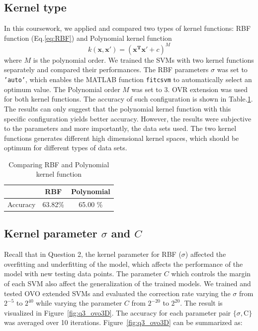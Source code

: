 \documentclass[10pt,twocolumn,letterpaper]{article}
\begin{document}
\subsection{Kernel type}
In this coursework, we applied and compared two types of kernel functions: RBF function (Eq.\ref{eq:RBF}) and Polynomial kernel function
\begin{equation}
k(\boldsymbol{x}, \boldsymbol{x'}) = (\boldsymbol{x^T} \boldsymbol{x'} + c)^M
\label{eq:poly}
\end{equation}
where $M$ is the polynomial order. We trained the SVMs with two kernel functions separately and compared their performances. The RBF parameters $\sigma$ was set to \texttt{'auto'}, which enables the MATLAB function \texttt{fitcsvm} to automatically select an optimum value. The Polynomial order $M$ was set to 3. OVR extension was used for both kernel functions. The accuracy of such configuration is shown in Table.\ref{tab:rbf_poly}. The results can only suggest that the polynomial kernel function with this specific configuration yields better accuracy. However, the results were subjective to the parameters and more importantly, the data sets used. The two kernel functions generates different high dimensional kernel spaces, which should be optimum for different types of data sets.

\begin{table}[h!]
	\centering
	\caption{Comparing RBF and Polynomial kernel function}
	\label{tab:rbf_poly}
	\begin{tabular}{ccc}
		\toprule
		~ & RBF & Polynomial\\
		\midrule
		Accuracy & 63.82\% & 65.00 \%\\
		\bottomrule
	\end{tabular}
\end{table}

\subsection{Kernel parameter $\sigma$ and $C$}
Recall that in Question 2, the kernel parameter for RBF ($\sigma$) affected the overfitting and underfitting of the model, which affects the performance of the model with new testing data points. The parameter $C$ which controls the margin of each SVM also affect the generalization of the trained models. We trained and tested OVO extended SVMs and evaluated the correction rate varying the $\sigma$ from $2^{-5}$ to $2^{40}$ while varying the parameter $C$ from $2^{-20}$ to $2^{20}$. The result is visualized in Figure~\ref{fig:q3_ovo3D}. The accuracy for each parameter pair $\{\sigma, $C$ \}$ was averaged over 10 iterations. Figure~\ref{fig:q3_ovo3D} can be summarized as: 
\end{document}
